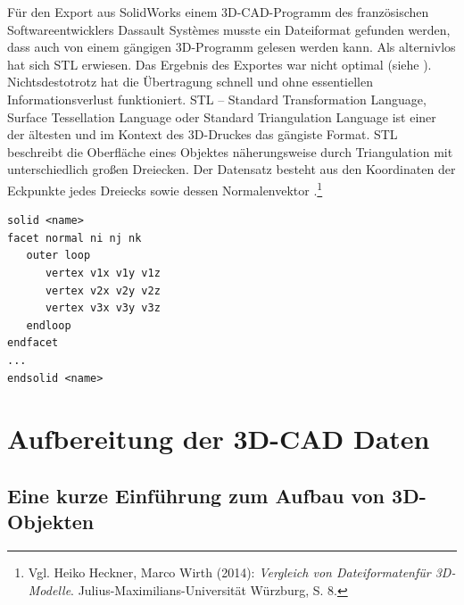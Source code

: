 Für den Export aus SolidWorks einem 3D-CAD-Programm des französischen Softwareentwicklers Dassault Systèmes musste ein Dateiformat gefunden werden, dass auch von einem gängigen 3D-Programm gelesen werden kann. Als alternivlos hat sich STL erwiesen. Das Ergebnis des Exportes war nicht optimal (siehe ). Nichtsdestotrotz hat die Übertragung schnell und ohne essentiellen Informationsverlust funktioniert.
STL -- Standard Transformation Language,  Surface Tessellation Language oder Standard Triangulation Language ist einer der ältesten und im Kontext des 3D-Druckes das gängiste Format.  
STL beschreibt die Oberfläche eines Objektes näherungsweise durch Triangulation mit unterschiedlich großen Dreiecken. Der Datensatz besteht aus den Koordinaten der Eckpunkte jedes Dreiecks sowie dessen Normalenvektor .\footnote{Vgl. Heiko Heckner, Marco Wirth (2014): \textit{Vergleich von Dateiformatenfür 3D-Modelle}. Julius-Maximilians-Universität Würzburg, S. 8.}


\begin{lstlisting}[caption={STL ASCII Schema.}, captionpos=b, label={lst:STL ASCII}]
solid <name>
facet normal ni nj nk
   outer loop
      vertex v1x v1y v1z
      vertex v2x v2y v2z
      vertex v3x v3y v3z
   endloop
endfacet
...
endsolid <name>

\end{lstlisting}

\clearpage

\section{Aufbereitung der 3D-CAD Daten}
\label{sec:AufbereitungDer3D-CADDaten}

\subsection{Eine kurze Einführung zum Aufbau von 3D-Objekten}
\label{subsec:KurzerEinschubZumAufbauVon3D-Objekten}

